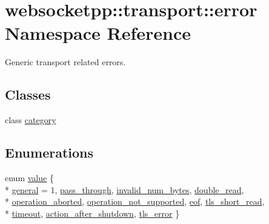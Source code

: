 \hypertarget{namespacewebsocketpp_1_1transport_1_1error}{}\section{websocketpp\+:\+:transport\+:\+:error Namespace Reference}
\label{namespacewebsocketpp_1_1transport_1_1error}


Generic transport related errors.  


\subsection*{Classes}
\begin{DoxyCompactItemize}
\item 
class \hyperlink{classwebsocketpp_1_1transport_1_1error_1_1category}{category}
\end{DoxyCompactItemize}
\subsection*{Enumerations}
\begin{DoxyCompactItemize}
\item 
enum \hyperlink{namespacewebsocketpp_1_1transport_1_1error_a8d371a2562d813e5a2e106e2694d4fb0}{value} \{ \\*
\hyperlink{namespacewebsocketpp_1_1transport_1_1error_a8d371a2562d813e5a2e106e2694d4fb0a161bc0c8148996271f7126aea2c24416}{general} = 1, 
\hyperlink{namespacewebsocketpp_1_1transport_1_1error_a8d371a2562d813e5a2e106e2694d4fb0a6a7cb8ef776c9eabe2324a529e991732}{pass\+\_\+through}, 
\hyperlink{namespacewebsocketpp_1_1transport_1_1error_a8d371a2562d813e5a2e106e2694d4fb0ab91204a395d7377d5eed5a789641a0ea}{invalid\+\_\+num\+\_\+bytes}, 
\hyperlink{namespacewebsocketpp_1_1transport_1_1error_a8d371a2562d813e5a2e106e2694d4fb0af77cb7d0fde9597a2f022a5eca0bdf61}{double\+\_\+read}, 
\\*
\hyperlink{namespacewebsocketpp_1_1transport_1_1error_a8d371a2562d813e5a2e106e2694d4fb0a887436887a8732e48f7c67bd85bb6f64}{operation\+\_\+aborted}, 
\hyperlink{namespacewebsocketpp_1_1transport_1_1error_a8d371a2562d813e5a2e106e2694d4fb0a7c3708669e1de6d4986d1db769fe214e}{operation\+\_\+not\+\_\+supported}, 
\hyperlink{namespacewebsocketpp_1_1transport_1_1error_a8d371a2562d813e5a2e106e2694d4fb0a73dd0d0f22cd67b7bcc031cd6bdef743}{eof}, 
\hyperlink{namespacewebsocketpp_1_1transport_1_1error_a8d371a2562d813e5a2e106e2694d4fb0af716728e7a91dafb4439a15e7c638112}{tls\+\_\+short\+\_\+read}, 
\\*
\hyperlink{namespacewebsocketpp_1_1transport_1_1error_a8d371a2562d813e5a2e106e2694d4fb0a0e2f0627b4105746429d747f6137b37e}{timeout}, 
\hyperlink{namespacewebsocketpp_1_1transport_1_1error_a8d371a2562d813e5a2e106e2694d4fb0acabe9e6ae399d59c020c9f78930f01f6}{action\+\_\+after\+\_\+shutdown}, 
\hyperlink{namespacewebsocketpp_1_1transport_1_1error_a8d371a2562d813e5a2e106e2694d4fb0a8e68893bc224f55aae654318734dcd40}{tls\+\_\+error}
 \}
\end{DoxyCompactItemize}

